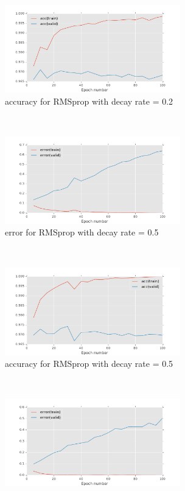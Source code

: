 \documentclass[11pt]{article}
\begin{document}
\begin{figure}[t!]
\begin{subfigure}[t]{0.45\textwidth}
        \centering
        \includegraphics[height=1.5in]{acc_with_RMSprop_decay_0_2.pdf}
        \caption{accuracy for RMSprop with decay rate = 0.2}
    \end{subfigure}    
	~
    \begin{subfigure}[t]{0.45\textwidth}
        \centering
        \includegraphics[height=1.5in]{error_with_RMSprop_decay_0_5.pdf}
        \caption{error for RMSprop with decay rate = 0.5}
    \end{subfigure}   
    ~
    \begin{subfigure}[t]{0.45\textwidth}
        \centering
        \includegraphics[height=1.5in]{acc_with_RMSprop_decay_0_5.pdf}
        \caption{accuracy for RMSprop with decay rate = 0.5}
    \end{subfigure}    
	~
    \begin{subfigure}[t]{0.45\textwidth}
        \centering
        \includegraphics[height=1.5in]{error_with_RMSprop_decay_0_9.pdf}

\end{subfigure}
\end{figure}
\end{document}
